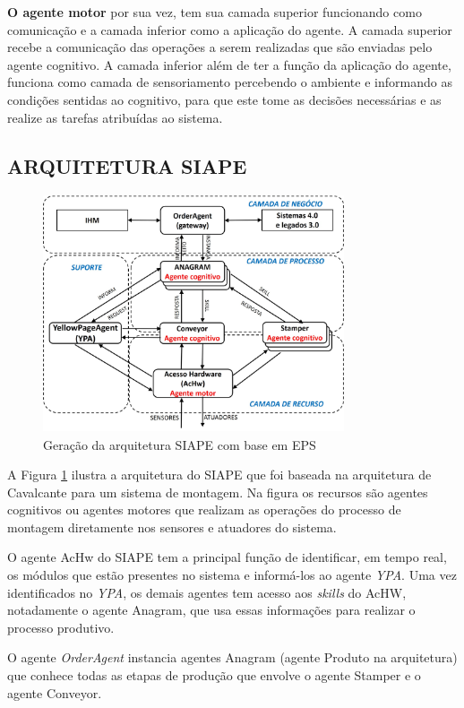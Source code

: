 \documentclass[10pt,letterpaper,twocolumn]{IEEEtran}
\begin{document}
\textbf{O agente motor} por sua vez, tem sua camada superior funcionando como comunicação e a camada inferior como a aplicação do agente. A camada superior recebe a comunicação das operações a serem realizadas que são enviadas pelo agente cognitivo. A camada inferior além de ter a função da aplicação do agente, funciona como camada de sensoriamento percebendo o ambiente e informando as condições sentidas ao  cognitivo, para que este tome as decisões necessárias e as realize as tarefas atribuídas ao sistema.

\subsection{ARQUITETURA SIAPE}
\begin{figure}[b]
	\centering
	\includegraphics[width=8.9cm, height=7cm]{MeDSE_imagens/F140_SIAPE.jpg}
	\caption{Geração da arquitetura SIAPE com base em EPS}
	\label{fig:eps_arquitetura_1}
\end{figure}

A Figura \ref{fig:eps_arquitetura_1} ilustra a arquitetura do SIAPE que foi baseada na arquitetura de Cavalcante para um sistema de montagem. Na figura os recursos são agentes cognitivos ou agentes motores que realizam as operações do processo de montagem diretamente nos sensores e atuadores do sistema. \par 
O agente AcHw do SIAPE  tem a principal função de identificar, em tempo real, os módulos que estão presentes no  sistema e informá-los ao agente  \textit{YPA}. Uma vez identificados no \textit{YPA}, os demais agentes tem acesso aos \textit{skills} do AcHW, notadamente o agente Anagram, que usa essas informações para realizar o processo produtivo. 

O agente \textit{OrderAgent} instancia agentes Anagram (agente Produto na arquitetura) que conhece todas as etapas de produção que envolve o agente Stamper e o agente Conveyor. 
\end{document}
